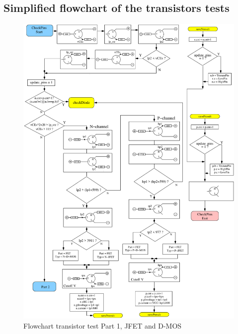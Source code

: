 \subsection{Simplified flowchart of the transistors tests}

\begin{figure}[H]
\centering
\includegraphics[]{../FIG/CheckSemi1.pdf}
\caption{Flowchart transistor test Part 1, JFET and D-MOS}
\label{fig:ChkSemi1}
\end{figure}

